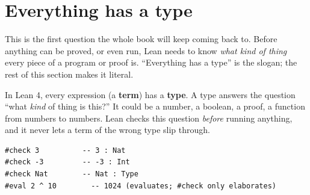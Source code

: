\section{Everything has a type}\label{sec:01-basics:01-everything-has-a-type:1}

This is the first question the whole book will keep coming back to. Before anything can be proved, or even run, Lean needs to know \emph{what kind of thing} every piece of a program or proof is. ``Everything has a type'' is the slogan; the rest of this section makes it literal.

In Lean 4, every expression (a \textbf{term}) has a \textbf{type}. A type answers the question ``what \emph{kind} of thing is this?'' It could be a number, a boolean, a proof, a function from numbers to numbers. Lean checks this question \emph{before} running anything, and it never lets a term of the wrong type slip through.

\begin{lstlisting}
#check 3          -- 3 : Nat
#check -3         -- -3 : Int
#check Nat        -- Nat : Type
#eval 2 ^ 10        -- 1024 (evaluates; #check only elaborates)
\end{lstlisting}

